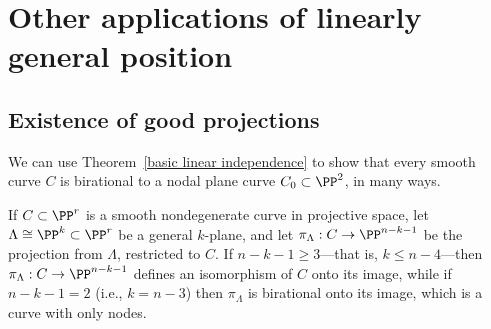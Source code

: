\section{Other applications of linearly general position}

\subsection{Existence of good projections}\label{projection section}\label{good projections}

We can use Theorem~\ref{basic linear independence} to show that every smooth curve $C$ is birational to a nodal plane curve $C_0 \subset \PP^2$, in many ways.

\begin{proposition}\label{nodal projection}
If $C \subset \PP^r$ is a smooth nondegenerate curve in projective space, let $\Lambda \cong \PP^{k} \subset \PP^r$ be a general $k$-plane, and let
$\pi_\Lambda : C \to \PP^{n-k-1}$ be the projection from $\Lambda$, restricted to $C$. If  $n-k-1 \geq 3$---that is, $k \leq n-4$---then
$\pi_\Lambda: C \to \PP^{n-k-1}$ defines an isomorphism of $C$ onto its image, while if $n-k-1 = 2$ (i.e., $k = n- 3$) then $\pi_\Lambda$ is birational onto its image, which is a curve with only nodes.
\end{proposition}

